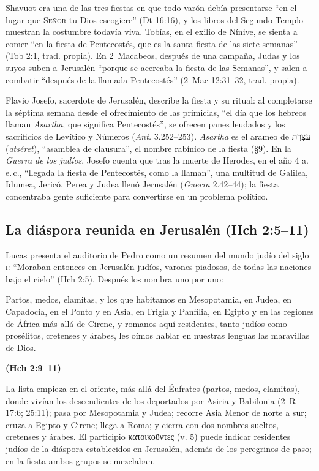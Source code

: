 \documentclass[11pt,letterpaper]{article}
\newcommand{\heb}[1]{\mbox{\foreignlanguage{hebrew}{#1}}}
\newcommand{\grc}[1]{\foreignlanguage{ancientgreek}{#1}}
\newcommand{\SENOR}{\textsc{Señor}}
\newcommand{\fuente}[1]{\par\hfill{\upshape\bfseries\small\textcolor{tierraroja}{#1}}}
\begin{document}
Shavuot era una de las tres fiestas en que todo varón debía presentarse ``en el lugar que \SENOR{} tu Dios escogiere'' (Dt 16:16), y los libros del Segundo Templo muestran la costumbre todavía viva. Tobías, en el exilio de Nínive, se sienta a comer ``en la fiesta de Pentecostés, que es la santa fiesta de las siete semanas'' (Tob 2:1, trad. propia). En 2~Macabeos, después de una campaña, Judas y los suyos suben a Jerusalén ``porque se acercaba la fiesta de las Semanas'', y salen a combatir ``después de la llamada Pentecostés'' (2~Mac 12:31--32, trad. propia).

Flavio Josefo, sacerdote de Jerusalén, describe la fiesta y su ritual: al completarse la séptima semana desde el ofrecimiento de las primicias, ``el día que los hebreos llaman \emph{Asartha}, que significa Pentecostés'', se ofrecen panes leudados y los sacrificios de Levítico y Números (\emph{Ant.} 3.252--253). \emph{Asartha} es el arameo de \heb{עֲצֶרֶת} (\emph{atséret}), ``asamblea de clausura'', el nombre rabínico de la fiesta (§9). En la \emph{Guerra de los judíos}, Josefo cuenta que tras la muerte de Herodes, en el año 4 a.\,e.\,c., ``llegada la fiesta de Pentecostés, como la llaman'', una multitud de Galilea, Idumea, Jericó, Perea y Judea llenó Jerusalén (\emph{Guerra} 2.42--44); la fiesta concentraba gente suficiente para convertirse en un problema político.

\subsection{La diáspora reunida en Jerusalén (Hch 2:5--11)}

Lucas presenta el auditorio de Pedro como un resumen del mundo judío del siglo \textsc{i}: ``Moraban entonces en Jerusalén judíos, varones piadosos, de todas las naciones bajo el cielo'' (Hch 2:5). Después los nombra uno por uno:

\begin{cita}Partos, medos, elamitas, y los que habitamos en Mesopotamia, en Judea, en Capadocia, en el Ponto y en Asia, en Frigia y Panfilia, en Egipto y en las regiones de África más allá de Cirene, y romanos aquí residentes, tanto judíos como prosélitos, cretenses y árabes, les oímos hablar en nuestras lenguas las maravillas de Dios.\fuente{(Hch 2:9--11)}\end{cita}

La lista empieza en el oriente, más allá del Éufrates (partos, medos, elamitas), donde vivían los descendientes de los deportados por Asiria y Babilonia (2~R 17:6; 25:11); pasa por Mesopotamia y Judea; recorre Asia Menor de norte a sur; cruza a Egipto y Cirene; llega a Roma; y cierra con dos nombres sueltos, cretenses y árabes. El participio \grc{κατοικοῦντες} (v. 5) puede indicar residentes judíos de la diáspora establecidos en Jerusalén, además de los peregrinos de paso; en la fiesta ambos grupos se mezclaban.
\end{document}
